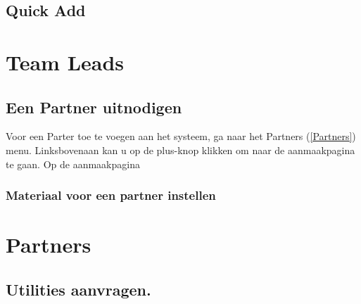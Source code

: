 \documentclass[]{memoir}
\begin{document}
\subsection{Quick Add} \label{BOQuickAdd}

\section{Team Leads} \label{TeamLeadInstr}
\subsection{Een Partner uitnodigen} \label{AddPartner}
Voor een Parter toe te voegen aan het systeem, ga naar het Partners (\ref{Partners}) menu. Linksbovenaan kan u op de plus-knop klikken om naar de aanmaakpagina te gaan.
Op de aanmaakpagina
\subsubsection{Materiaal voor een partner instellen} \label{AddPartnerMaterial}

\section{Partners} \label{PartnerInstr}
\subsection{Utilities aanvragen.} \label{RequestMaterial}
\end{document}
